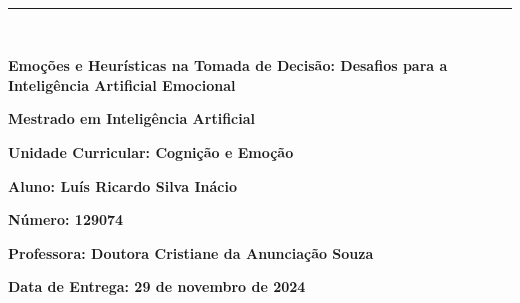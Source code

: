 \documentclass[a4paper,12pt]{report}
\begin{document}
	
\begin{titlepage}
	\centering
	\vspace*{-2cm} %
	
	\hfill%
	\\[0.5cm]
	
	\noindent
	{\color{barraazul}\rule{\textwidth}{1mm}} %
	\\[1cm]
	
	{\LARGE  \textbf{Emoções e Heurísticas na Tomada de Decisão: Desafios para a Inteligência Artificial Emocional} \par}
	\vspace{3cm}
	
	{\Large \textbf{Mestrado em Inteligência Artificial}} \par
	\vspace{1cm}
	{\large \textbf{Unidade Curricular: Cognição e Emoção}} \par
	\vspace{3cm}
	
	{\large \textbf{Aluno: Luís Ricardo Silva Inácio}} \par
	{\large \textbf{Número: 129074}} \par
	\vspace{3cm}
	

	
	{\large \textbf{Professora: Doutora Cristiane da Anunciação Souza}} \par
	\vfill
	
	\vspace{0.5cm}
	{\large \textbf{Data de Entrega: 29 de novembro de 2024}} \par
\end{titlepage}
\end{document}
